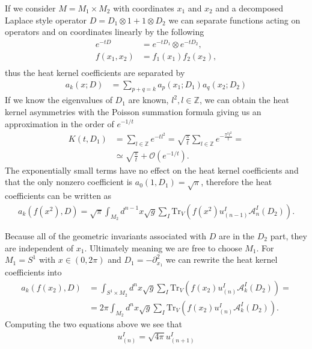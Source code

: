 If we consider $M = M_1 \times M_2$ with coordinates $x_1$ and $x_2$ and a
decomposed Laplace style operator $D = D_1 \otimes 1 + 1 \otimes D_2$ we can
separate functions acting on operators and on coordinates linearly by the
following
\begin{align}
    e^{-tD} &= e^{-tD_1} \otimes e^{-tD_2},\\
    f(x_1, x_2) &= f_1(x_1)f_2(x_2),\\
\end{align}
thus the heat kernel coefficients are separated by
\begin{align}
    a_k(x;D) &= \sum_{p+q=k} a_p(x_1; D_1)a_q(x_2;D_2)
\end{align}
If we know the eigenvalues of $D_1$ are known,  $l^2, l\in \mathbb{Z}$, we
can obtain the heat kernel asymmetries with the Poisson summation formula
giving us an approximation in the order of $e^{-1/t}$
\begin{align}
    K(t, D_1) &= \sum_{l\in\mathbb{Z}} e^{-tl^2} = \sqrt{\frac{\pi}{t}}
    \sum_{l\in\mathbb{Z}} e^{-\frac{\pi^2l^2}{t}} = \\
    &\simeq \sqrt{\frac{\pi}{t}} + \mathcal{O}(e^{-1/t}).
\end{align}
The exponentially small terms have no effect on the heat kernel
coefficients and that the only nonzero coefficient is $a_0(1, D_1) =
\sqrt{\pi}$, therefore the heat coefficients can be written as
\begin{align}
    a_k(f(x^2), D) = \sqrt{\pi}\int_{M_2}
    d^{n-1}x\sqrt{g}\sum_I\text{Tr}_V\left(f(x^2)u^I_{(n-1)}
    \mathcal{A}^I_n(D_2)\right).
\end{align}

Because all of the geometric invariants  associated with $D$ are in the $D_2$
part, they are independent of $x_1$. Ultimately meaning we are free to choose
$M_1$. For $M_1 = S^1$ with $x\in (0, 2\pi)$ and $D_1=-\partial_{x_1}^2$
we can rewrite the heat kernel coefficients into
\begin{align}
    a_k(f(x_2), D) &= \int_{S^1\times M_2}d^nx \sqrt{g} \sum_I
    \text{Tr}_V(f(x_2) u_{(n)}^I \mathcal{A}^I_k(D_2))=\\
    &= 2\pi \int_{M_2} d^nx\sqrt{g} \sum_I\text{Tr}_V(f(x_2) u_{(n)}^I
    \mathcal{A}^I_k(D_2)).
\end{align}
Computing the two equations above we see that
\begin{align}
    u_{(n)}^I = \sqrt{4\pi} u^I_{(n+1)}
\end{align}

